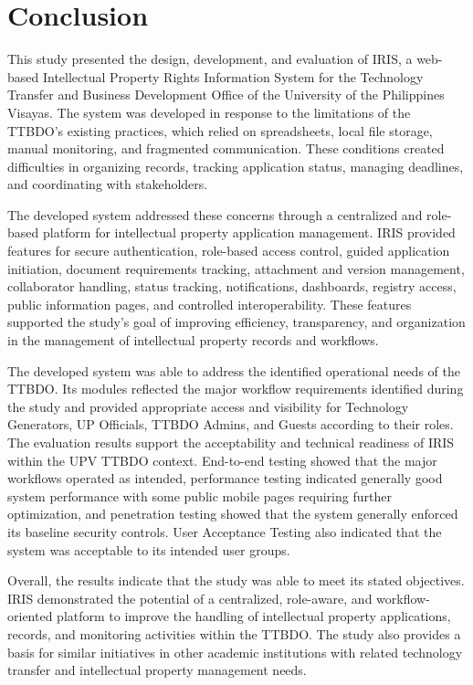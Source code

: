 \chapter{Conclusion}

This study presented the design, development, and evaluation of IRIS, a web-based Intellectual Property Rights Information System for the Technology Transfer and Business Development Office of the University of the Philippines Visayas. The system was developed in response to the limitations of the TTBDO's existing practices, which relied on spreadsheets, local file storage, manual monitoring, and fragmented communication. These conditions created difficulties in organizing records, tracking application status, managing deadlines, and coordinating with stakeholders.

The developed system addressed these concerns through a centralized and role-based platform for intellectual property application management. IRIS provided features for secure authentication, role-based access control, guided application initiation, document requirements tracking, attachment and version management, collaborator handling, status tracking, notifications, dashboards, registry access, public information pages, and controlled interoperability. These features supported the study's goal of improving efficiency, transparency, and organization in the management of intellectual property records and workflows.

The developed system was able to address the identified operational needs of the TTBDO. Its modules reflected the major workflow requirements identified during the study and provided appropriate access and visibility for Technology Generators, UP Officials, TTBDO Admins, and Guests according to their roles. The evaluation results support the acceptability and technical readiness of IRIS within the UPV TTBDO context. End-to-end testing showed that the major workflows operated as intended, performance testing indicated generally good system performance with some public mobile pages requiring further optimization, and penetration testing showed that the system generally enforced its baseline security controls. User Acceptance Testing also indicated that the system was acceptable to its intended user groups.

Overall, the results indicate that the study was able to meet its stated objectives. IRIS demonstrated the potential of a centralized, role-aware, and workflow-oriented platform to improve the handling of intellectual property applications, records, and monitoring activities within the TTBDO. The study also provides a basis for similar initiatives in other academic institutions with related technology transfer and intellectual property management needs.

